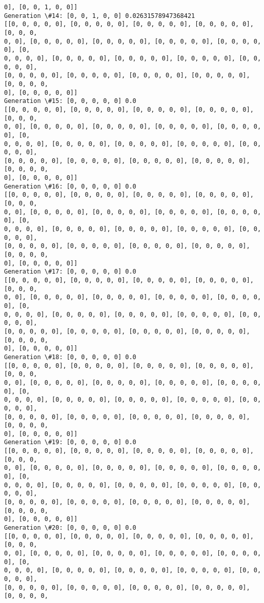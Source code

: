 \documentclass[11pt]{article}
\begin{document}
\begin{Verbatim}[commandchars=\\\{\}]
0], [0, 0, 1, 0, 0]]
Generation \#14: [0, 0, 1, 0, 0] 0.02631578947368421
[[0, 0, 0, 0, 0], [0, 0, 0, 0, 0], [0, 0, 0, 0, 0], [0, 0, 0, 0, 0], [0, 0, 0,
0, 0], [0, 0, 0, 0, 0], [0, 0, 0, 0, 0], [0, 0, 0, 0, 0], [0, 0, 0, 0, 0], [0,
0, 0, 0, 0], [0, 0, 0, 0, 0], [0, 0, 0, 0, 0], [0, 0, 0, 0, 0], [0, 0, 0, 0, 0],
[0, 0, 0, 0, 0], [0, 0, 0, 0, 0], [0, 0, 0, 0, 0], [0, 0, 0, 0, 0], [0, 0, 0, 0,
0], [0, 0, 0, 0, 0]]
Generation \#15: [0, 0, 0, 0, 0] 0.0
[[0, 0, 0, 0, 0], [0, 0, 0, 0, 0], [0, 0, 0, 0, 0], [0, 0, 0, 0, 0], [0, 0, 0,
0, 0], [0, 0, 0, 0, 0], [0, 0, 0, 0, 0], [0, 0, 0, 0, 0], [0, 0, 0, 0, 0], [0,
0, 0, 0, 0], [0, 0, 0, 0, 0], [0, 0, 0, 0, 0], [0, 0, 0, 0, 0], [0, 0, 0, 0, 0],
[0, 0, 0, 0, 0], [0, 0, 0, 0, 0], [0, 0, 0, 0, 0], [0, 0, 0, 0, 0], [0, 0, 0, 0,
0], [0, 0, 0, 0, 0]]
Generation \#16: [0, 0, 0, 0, 0] 0.0
[[0, 0, 0, 0, 0], [0, 0, 0, 0, 0], [0, 0, 0, 0, 0], [0, 0, 0, 0, 0], [0, 0, 0,
0, 0], [0, 0, 0, 0, 0], [0, 0, 0, 0, 0], [0, 0, 0, 0, 0], [0, 0, 0, 0, 0], [0,
0, 0, 0, 0], [0, 0, 0, 0, 0], [0, 0, 0, 0, 0], [0, 0, 0, 0, 0], [0, 0, 0, 0, 0],
[0, 0, 0, 0, 0], [0, 0, 0, 0, 0], [0, 0, 0, 0, 0], [0, 0, 0, 0, 0], [0, 0, 0, 0,
0], [0, 0, 0, 0, 0]]
Generation \#17: [0, 0, 0, 0, 0] 0.0
[[0, 0, 0, 0, 0], [0, 0, 0, 0, 0], [0, 0, 0, 0, 0], [0, 0, 0, 0, 0], [0, 0, 0,
0, 0], [0, 0, 0, 0, 0], [0, 0, 0, 0, 0], [0, 0, 0, 0, 0], [0, 0, 0, 0, 0], [0,
0, 0, 0, 0], [0, 0, 0, 0, 0], [0, 0, 0, 0, 0], [0, 0, 0, 0, 0], [0, 0, 0, 0, 0],
[0, 0, 0, 0, 0], [0, 0, 0, 0, 0], [0, 0, 0, 0, 0], [0, 0, 0, 0, 0], [0, 0, 0, 0,
0], [0, 0, 0, 0, 0]]
Generation \#18: [0, 0, 0, 0, 0] 0.0
[[0, 0, 0, 0, 0], [0, 0, 0, 0, 0], [0, 0, 0, 0, 0], [0, 0, 0, 0, 0], [0, 0, 0,
0, 0], [0, 0, 0, 0, 0], [0, 0, 0, 0, 0], [0, 0, 0, 0, 0], [0, 0, 0, 0, 0], [0,
0, 0, 0, 0], [0, 0, 0, 0, 0], [0, 0, 0, 0, 0], [0, 0, 0, 0, 0], [0, 0, 0, 0, 0],
[0, 0, 0, 0, 0], [0, 0, 0, 0, 0], [0, 0, 0, 0, 0], [0, 0, 0, 0, 0], [0, 0, 0, 0,
0], [0, 0, 0, 0, 0]]
Generation \#19: [0, 0, 0, 0, 0] 0.0
[[0, 0, 0, 0, 0], [0, 0, 0, 0, 0], [0, 0, 0, 0, 0], [0, 0, 0, 0, 0], [0, 0, 0,
0, 0], [0, 0, 0, 0, 0], [0, 0, 0, 0, 0], [0, 0, 0, 0, 0], [0, 0, 0, 0, 0], [0,
0, 0, 0, 0], [0, 0, 0, 0, 0], [0, 0, 0, 0, 0], [0, 0, 0, 0, 0], [0, 0, 0, 0, 0],
[0, 0, 0, 0, 0], [0, 0, 0, 0, 0], [0, 0, 0, 0, 0], [0, 0, 0, 0, 0], [0, 0, 0, 0,
0], [0, 0, 0, 0, 0]]
Generation \#20: [0, 0, 0, 0, 0] 0.0
[[0, 0, 0, 0, 0], [0, 0, 0, 0, 0], [0, 0, 0, 0, 0], [0, 0, 0, 0, 0], [0, 0, 0,
0, 0], [0, 0, 0, 0, 0], [0, 0, 0, 0, 0], [0, 0, 0, 0, 0], [0, 0, 0, 0, 0], [0,
0, 0, 0, 0], [0, 0, 0, 0, 0], [0, 0, 0, 0, 0], [0, 0, 0, 0, 0], [0, 0, 0, 0, 0],
[0, 0, 0, 0, 0], [0, 0, 0, 0, 0], [0, 0, 0, 0, 0], [0, 0, 0, 0, 0], [0, 0, 0, 0,

\end{Verbatim}
\end{document}
